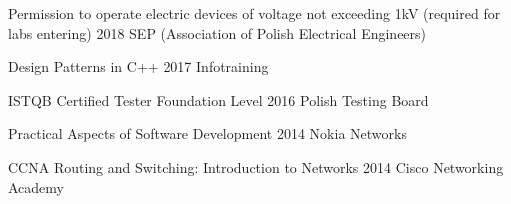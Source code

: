 


\begin{cvcourses}

  \cvcourse
    {Permission to operate electric devices of voltage not exceeding 1kV (required for labs entering)}
    {2018}
    {SEP (Association of Polish Electrical Engineers)}

  \cvcourse
    {Design Patterns in C++}
    {2017}
    {Infotraining}

  \cvcourse
    {ISTQB Certified Tester Foundation Level}
    {2016}
    {Polish Testing Board}

  \cvcourse
    {Practical Aspects of Software Development}
    {2014}
    {Nokia Networks}

  \cvcourse
    {CCNA Routing and Switching: Introduction to Networks}
    {2014}
    {Cisco Networking Academy}

\end{cvcourses}
